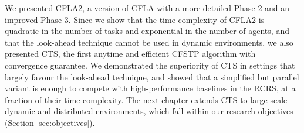 We presented CFLA2, a version of CFLA with a more detailed Phase $2$ and an improved Phase
$3$. Since we show that the time complexity of CFLA2 is quadratic in the number of tasks
and exponential in the number of agents, and that the look-ahead technique cannot be
used in dynamic environments, we also presented CTS, the first anytime and efficient
CFSTP algorithm with convergence guarantee. We demonstrated the superiority of CTS in
settings that largely favour the look-ahead technique, and showed that a simplified but
parallel variant is enough to compete with high-performance baselines in the RCRS,
at a fraction of their time complexity.
The next chapter extends CTS to large-scale dynamic and distributed environments, which
fall within our research objectives (Section \ref{sec:objectives}).
